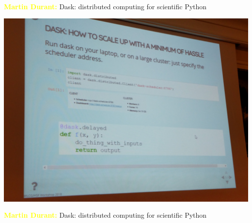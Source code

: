 \documentclass[aspectratio=169]{beamer}
\begin{document}
\begin{frame}{\textcolor{yellow}{\bf Martin Durant:} Dask: distributed computing for scientific Python}
\vspace{0.13 cm}
\begin{center}
\includegraphics[width=0.73\linewidth]{dask-1.png}
\end{center}
\end{frame}

\begin{frame}{\textcolor{yellow}{\bf Martin Durant:} Dask: distributed computing for scientific Python}
\vspace{0.25 cm}
\end{frame}
\end{document}
